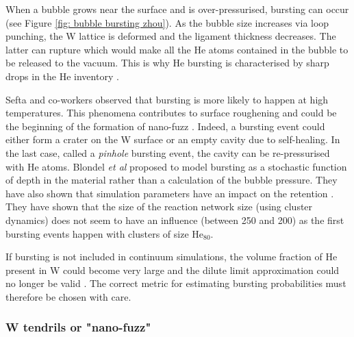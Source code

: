 When a bubble grows near the surface and is over-pressurised, bursting can occur (see Figure \ref{fig: bubble bursting zhou}).
As the bubble size increases via loop punching, the W lattice is deformed and the ligament thickness decreases.
The latter can rupture which would make all the He atoms contained in the bubble to be released to the vacuum.
This is why He bursting is characterised by sharp drops in the He inventory .

Sefta and co-workers observed that bursting is more likely to happen at high temperatures.
This phenomena contributes to surface roughening and could be the beginning of the formation of nano-fuzz .
Indeed, a bursting event could either form a crater on the W surface or an empty cavity due to self-healing.
In the last case, called a \textit{pinhole} bursting event, the cavity can be re-pressurised with He atoms.
Blondel \textit{et al} proposed to model bursting as a stochastic function of depth in the material rather than a calculation of the bubble pressure.
They have also shown that simulation parameters have an impact on the retention .
They have shown that the size of the reaction network size (using cluster dynamics) does not seem to have an influence (between 250 and 200) as the first bursting events happen with clusters of size $\text{He}_{80}$.

If bursting is not included in continuum simulations, the volume fraction of He present in W could become very large and the dilute limit approximation could no longer be valid .
The correct metric for estimating bursting probabilities must therefore be chosen with care.

\subsubsection{W tendrils or "nano-fuzz"}

